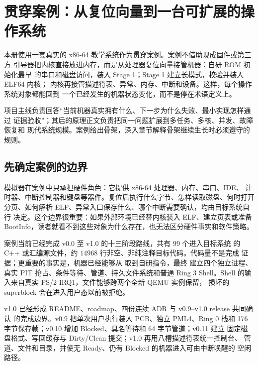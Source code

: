 \chapter*{贯穿案例：从复位向量到一台可扩展的操作系统}

本册使用一套真实的 x86-64 教学系统作为贯穿案例。案例不借助现成固件或第三方
引导器把内核直接放进内存，而是从处理器复位向量接管机器：自研 ROM 初始化最早
的串口和磁盘访问，装入 Stage 1；Stage 1 建立长模式，校验并装入 ELF64 内核；
内核再接管描述符表、异常、内存、中断和设备。这样，每个操作系统对象都能回到
一个已经发生的机器状态变化，而不是停在术语定义上。

\begin{keyidea}
项目主线负责回答“当前机器真实拥有什么、下一步为什么失败、最小实现怎样通过
证据验收”；其后的原理正文负责把同一问题扩展到多任务、多核、并发、故障恢复和
现代系统规模。案例给出骨架，深入章节解释骨架继续生长时必须遵守的规则。
\end{keyidea}

\section*{先确定案例的边界}

模拟器在案例中只承担硬件角色：它提供 x86-64 处理器、内存、串口、IDE、
计时器、中断控制器和键盘等器件。复位后执行什么字节、怎样读取磁盘、何时打开
分页、如何解析 ELF、异常入口保存什么、哪个中断需要确认，均由目标系统自行
决定。这个边界很重要：如果外部环境已经替内核装入 ELF、建立页表或准备
BootInfo，读者就看不到这些对象为什么存在，也无法区分硬件事实和软件策略。

案例当前已经完成 v0.0 至 v1.0 的十三阶段路线，共有 \(99\) 个进入目标系统
的 C++ 或汇编源文件，约 \(14968\) 行非空、非纯注释目标代码。代码量不是完成
证据；更重要的事实是，机器已经能够从  取到自研指令，最终
建立四个独立进程、真实 PIT 抢占、条件等待、管道、持久文件系统和普通 Ring 3
Shell。Shell 的输入来自真实 PS/2 IRQ1，文件能够跨两个全新 QEMU 实例保留，
损坏的 superblock 会在进入用户态以前被拒绝。

v1.0 已经形成 README、roadmap、四份连续 ADR 与 v0.9--v1.0 release 共同确认
的完成边界。v0.9 把单次用户执行装入 PCB、独立 PML4、Ring 0 栈和
176 字节保存帧；v0.10 增加 Blocked、具名等待和 64 字节管道；v0.11 建立
固定磁盘格式、写回缓存与 Dirty/Clean 提交；v1.0 再用八槽描述符表统一控制台、
管道、文件和目录，并使无 Ready、仍有 Blocked 的机器进入可由中断唤醒的
 空闲路径。

